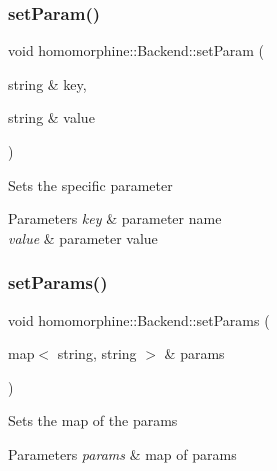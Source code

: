 \mbox{\label{classhomomorphine_1_1_backend_aacb924f4de6d50347d550da85aec15a2}} 
\subsubsection{\texorpdfstring{setParam()}{setParam()}}
{\footnotesize\ttfamily void homomorphine\+::\+Backend\+::set\+Param (\begin{DoxyParamCaption}\item[{string \&}]{key,  }\item[{string \&}]{value }\end{DoxyParamCaption})}

Sets the specific parameter


\begin{DoxyParams}{Parameters}
{\em key} & parameter name \\
\hline
{\em value} & parameter value \\
\hline
\end{DoxyParams}
\mbox{\label{classhomomorphine_1_1_backend_aed04b9aa4eb2c08801e099b16b4da4b0}} 
\subsubsection{\texorpdfstring{setParams()}{setParams()}}
{\footnotesize\ttfamily void homomorphine\+::\+Backend\+::set\+Params (\begin{DoxyParamCaption}\item[{map$<$ string, string $>$ \&}]{params }\end{DoxyParamCaption})}

Sets the map of the params


\begin{DoxyParams}{Parameters}
{\em params} & map of params \\
\hline
\end{DoxyParams}
\mbox{\label{classhomomorphine_1_1_backend_a7c1236495e4aa6481871852edfff327a}} 
